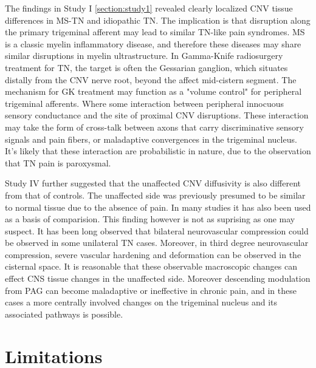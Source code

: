 The findings in Study I \ref{section:study1} revealed clearly localized CNV tissue differences in MS-TN and idiopathic TN. The implication is that disruption along the primary trigeminal afferent may lead to similar TN-like pain syndromes. MS is a classic myelin inflammatory disease, and therefore these diseases may share similar disruptions in myelin ultrastructure. In Gamma-Knife radiosurgery treatment for TN, the target is often the Gessarian ganglion, which situates distally from the CNV nerve root, beyond the affect mid-cistern segment. The mechanism for GK treatment may function as a "volume control" for peripheral trigeminal afferents. Where some interaction between peripheral innocuous sensory conductance and the site of proximal CNV disruptions. These interaction may take the form of cross-talk between axons that carry discriminative sensory signals and pain fibers, or maladaptive convergences in the trigeminal nucleus. It's likely that these interaction are probabilistic in nature, due to the observation that TN pain is paroxysmal. 

Study IV further suggested that the unaffected CNV diffusivity is also different from that of controls. The unaffected side was previously presumed to be similar to normal tissue due to the absence of pain. In many studies it has also been used as a basis of comparision. This finding however is not as suprising as one may suspect. It has been long observed that bilateral neurovascular compression could be observed in some unilateral TN cases. Moreover, in third degree neurovascular compression, severe vascular hardening and deformation can be observed in the cisternal space. It is reasonable that these observable macroscopic changes can effect CNS tissue changes in the unaffected side. Moreover descending modulation from PAG can become maladaptive or ineffective in chronic pain, and in these cases a more centrally involved changes on the trigeminal nucleus and its associated pathways is possible. 

\section{Limitations}


